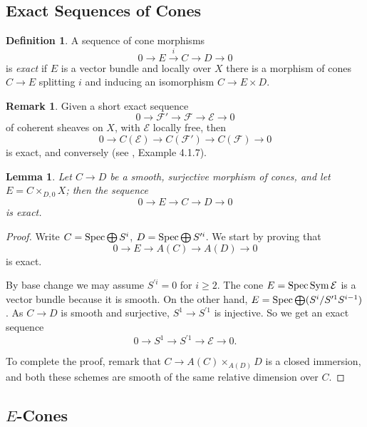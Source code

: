 \documentclass[11pt]{article}
\theoremstyle{plain}
\newtheorem{lem}[prop]{Lemma}
\theoremstyle{definition}
\newtheorem{defnp}[prop]{Definition}
\newenvironment{defn}{\begin{defnp}\normalfont}{\end{defnp}}
\newtheorem{rmkp}{Remark}\renewcommand{\thermkp}{}
\newenvironment{rmk}{\begin{rmkp}\normalfont}{\end{rmkp}}
\newenvironment{pf}{\begin{proof}}{\end{proof}}
\newcommand{\eE}{{\mathcal{E}}}
\newcommand{\fF}{{\mathcal{F}}}
\newcommand{\spec}{\mathop{\rm Spec}\nolimits}
\newcommand{\Sym}{\mathop{\rm Sym}\nolimits}
\newcommand{\ses}[5]
{0\longrightarrow#1\stackrel{#2}{ \longrightarrow}#3\stackrel{#4}{
\longrightarrow}#5\longrightarrow0}
\theoremstyle{plain}
\theoremstyle{definition}
\theoremstyle{remark}
\begin{document}
\subsection{Exact Sequences of Cones}

\begin{defn} A sequence of cone morphisms
\[
\ses E{i}C{}D
\]
is {\em exact} if \(E\) is a vector bundle and locally over \(X\) there is a
morphism of cones \(C\to E\) splitting \(i\) and inducing an isomorphism \(C\to
E\times D\).
\end{defn}
\begin{rmk} Given a short exact sequence
\[
\ses {\fF'}{}\fF{}\eE
\]
of coherent sheaves on \(X\), with \(\eE\) locally free, then
\[
\ses {C(\eE)}{}{C(\fF')}{}{C(\fF)}
\]
is exact, and conversely (see \cite{fulton}, Example 4.1.7).
\end{rmk}
\begin{lem} \label{ssmc}
Let \(C\to D\) be a smooth, surjective morphism of cones, and let
\(E=C\times_{D,0}X\); then the sequence
\[
\ses E{}C{}D
\]
is exact.
\end{lem}
\begin{pf}
Write \(C=\spec\bigoplus S^i\), \(D=\spec\bigoplus S^{\prime i}\). We
start by proving that
\[
\ses E{}{A(C)}{}{A(D)}
\]
is exact.

By base change we may assume \(S^{\prime i}=0\) for \(i\ge 2\). The cone
\(E=\spec\Sym\eE\) is a vector bundle because it is smooth. On the other
hand, \(E=\spec\bigoplus(S^i/S^{\prime 1}S^{i-1})\). As \(C\to D\) is
smooth and surjective, \(S^1\to S^{\prime 1}\) is injective. So we get
an exact sequence
\[
\ses{S^1}{}{S^{\prime 1}}{}\eE.
\]

To complete the proof, remark that \(C\to A(C)\times_{A(D)}D\) is a
closed immersion, and both these schemes are smooth of the same
relative dimension over \(C\).
\end{pf}

\subsection{\texorpdfstring{\(E\)}{E}-Cones}
\end{document}
